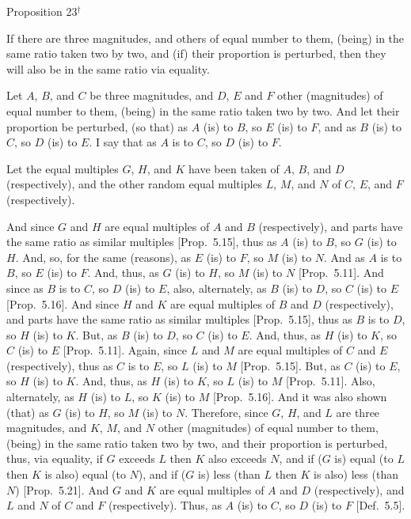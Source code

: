 
\begin{center}
{\large Proposition 23}$^\dag$
\end{center}

If there are three magnitudes, and others of equal number to them, (being) in the same ratio taken two by two, and (if) their
proportion is perturbed, then they will also be in the same ratio via equality.

\epsfysize=0.75in
\centerline{}

Let $A$, $B$, and $C$ be three magnitudes, and $D$, $E$ and $F$ other (magnitudes) of equal  number to them, (being) in the same ratio taken two by two.
And let their proportion be perturbed, (so that) as $A$ (is) to $B$, so $E$ (is) to $F$,
and as $B$ (is) to $C$, so $D$ (is) to $E$. I say that as $A$ is to $C$, so $D$ (is) to $F$.

Let the equal multiples $G$, $H$, and $K$ have been taken of $A$, $B$, and $D$ (respectively), and the other random equal multiples $L$, $M$, and $N$ of
$C$, $E$, and $F$ (respectively).

And since $G$ and $H$ are equal multiples of $A$ and $B$ (respectively), and
parts have the same ratio as similar multiples [Prop.~5.15], thus as $A$ (is) to $B$, so $G$ (is) to $H$. 
And, so, for the same (reasons), as $E$ (is) to $F$, so $M$ (is) to $N$. And as
$A$ is to $B$, so $E$ (is) to $F$.  And, thus, as $G$ (is) to $H$, so $M$ (is) to $N$ [Prop.~5.11]. And since as $B$ is to $C$, so $D$ (is) to $E$,
also, alternately, as $B$ (is) to $D$, so $C$ (is) to $E$ [Prop.~5.16]. And since $H$ and $K$ are equal multiples
of $B$ and $D$ (respectively), and parts have the same ratio as similar multiples
[Prop.~5.15], thus as $B$ is to $D$, so $H$
(is) to $K$. But, as $B$ (is) to $D$, so $C$ (is) to $E$.  And, thus, as $H$ (is) to $K$, so $C$ (is) to $E$ [Prop.~5.11]. Again, since
$L$ and $M$ are  equal multiples of $C$ and $E$ (respectively), thus as
$C$ is to $E$, so $L$ (is) to $M$ [Prop.~5.15].
But, as $C$ (is) to $E$, so $H$ (is) to $K$. And, thus, as $H$ (is) to $K$,
so $L$ (is) to $M$ [Prop.~5.11]. Also, alternately,
as $H$ (is) to $L$, so $K$ (is) to $M$ [Prop.~5.16].
And it was also shown (that) as $G$ (is) to $H$, so $M$ (is) to $N$. Therefore,
since $G$, $H$, and $L$ are three magnitudes, and $K$, $M$, and $N$ other (magnitudes)
of equal number to them, (being) in the same ratio taken two by two, 
and their proportion is perturbed, thus, via equality, if $G$ exceeds
$L$ then $K$ also exceeds $N$, and if ($G$ is) equal (to $L$ then $K$ is also) equal (to $N$),
and if ($G$ is) less (than $L$ then $K$ is also) less (than $N$)  [Prop.~5.21]. And $G$ and $K$ are equal
multiples of $A$ and $D$ (respectively), and $L$ and $N$ of $C$ and $F$ (respectively). 
Thus, as $A$ (is) to $C$, so $D$ (is) to $F$  [Def.~5.5].

